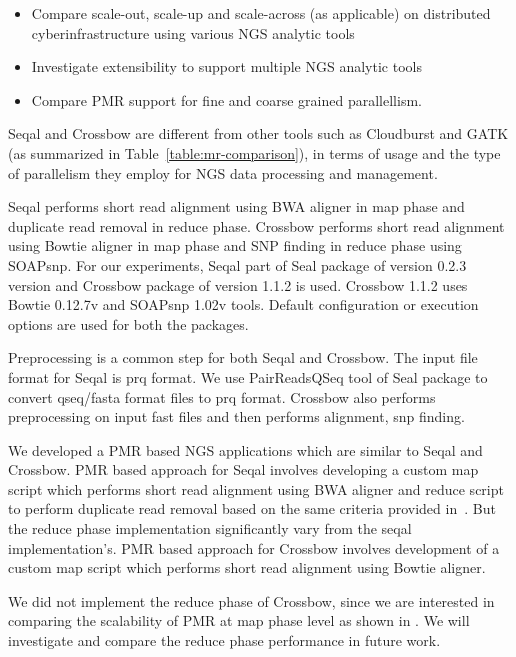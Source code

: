 \documentclass{acm_proc_article-sp}
\begin{document}
\begin{itemize}

\item{Compare scale-out, scale-up and scale-across (as applicable) on
    distributed cyberinfrastructure using various NGS analytic tools}
\item{Investigate extensibility to support multiple NGS analytic
    tools}
\item{Compare PMR support for fine and coarse grained parallellism}.
\end{itemize}

Seqal and Crossbow are different from other tools such as Cloudburst
and GATK (as summarized in Table~\ref{table:mr-comparison}), in terms
of usage and the type of parallelism they employ for NGS data
processing and management.

Seqal performs short read alignment using BWA aligner in map phase and
duplicate read removal in reduce phase.  Crossbow performs short read
alignment using Bowtie aligner in map phase and SNP finding in reduce
phase using SOAPsnp. For our experiments, Seqal part of Seal package
of version 0.2.3 version and Crossbow package of version 1.1.2 is
used. Crossbow 1.1.2 uses Bowtie 0.12.7v and SOAPsnp 1.02v
tools. Default configuration or execution options are used for both
the packages.

Preprocessing is a common step for both Seqal and Crossbow. The input
file format for Seqal is prq format.  We use PairReadsQSeq tool of
Seal package to convert qseq/fasta format files to prq
format. Crossbow also performs preprocessing on input fast files and
then performs alignment, snp finding. 

We developed a PMR based NGS applications which are similar to Seqal
and Crossbow. PMR based approach for Seqal involves developing a
custom map script which performs short read alignment using BWA
aligner and reduce script to perform duplicate read removal based on
the same criteria provided in~\cite{seal_2011_mapred}. But the reduce
phase implementation significantly vary from the seqal
implementation's. PMR based approach for Crossbow involves development
of a custom map script which performs short read alignment using
Bowtie aligner.

We did not implement the reduce phase of Crossbow, since we are
interested in comparing the scalability of PMR at map phase level as
shown in . We will investigate and compare the
reduce phase performance in future work.
\end{document}
